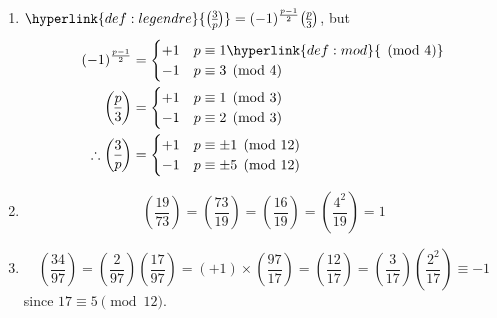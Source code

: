 \documentclass{article}
\newcommand{\legendre}[2]{\genfrac{(}{)}{}{}{#1}{#2}}
\begin{document}
\begin{eg}
    \leavevmode
    \begin{enumerate}[label=(\roman*)]
        \item $\hyperlink{def:legendre}{\legendre{3}{p}} = (-1)^\frac{p-1}{2} \legendre{p}{3}$, but
            \begin{align*}
                (-1)^\frac{p-1}{2} &=
                \begin{cases}
                    +1 & p \equiv 1 \hyperlink{def:mod}{\pmod{4}} \\
                    -1 & p \equiv 3 \pmod{4}
                \end{cases}
                \\
                \legendre{p}{3} &=
                \begin{cases}
                    +1 & p \equiv 1 \pmod{3} \\
                    -1 & p \equiv 2 \pmod{3}
                \end{cases}
                \\
                \therefore \legendre{3}{p} &=
                \begin{cases}
                    +1 & p \equiv \pm 1 \pmod{12} \\
                    -1 & p \equiv \pm 5 \pmod{12}
                \end{cases}
            \end{align*}
        \item
            \begin{equation*}
                \legendre{19}{73} = \legendre{73}{19} = \legendre{16}{19} = \legendre{4^2}{19} = 1
            \end{equation*}
        \item
            \begin{equation*}
                \legendre{34}{97} = \legendre{2}{97} \legendre{17}{97}
                = (+1) \times \legendre{97}{17}
                = \legendre{12}{17}
                = \legendre{3}{17} \legendre{2^2}{17}
                \equiv -1
            \end{equation*}
            since $17 \equiv 5 \pmod{12}$.
    \end{enumerate}
\end{eg}
\end{document}

